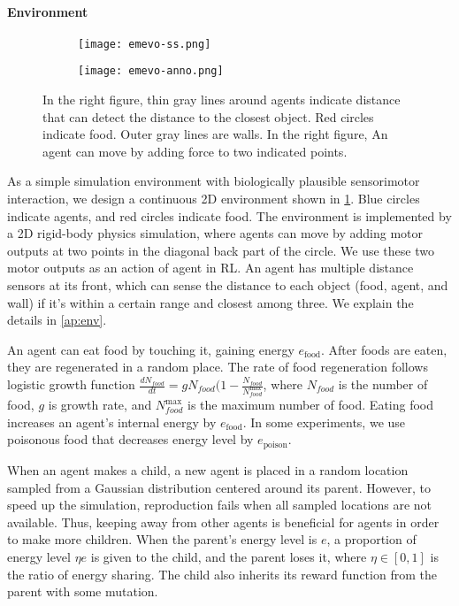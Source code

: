 \paragraph{Environment}

\begin{figure}[t]
  \begin{subfigure}[t]{6cm}
    \centering
    \texttt{[image: emevo-ss.png]}
  \end{subfigure}
  \begin{subfigure}[t]{8cm}
    \centering
    \texttt{[image: emevo-anno.png]}
  \end{subfigure}
  \caption{
    In the right figure, thin gray lines around agents indicate distance that can detect the distance to the closest object. Red circles indicate food. Outer gray lines are walls.
    In the right figure, An agent can move by adding force to two indicated points.
  }\label{figure:env}
\end{figure}

As a simple simulation environment with biologically plausible sensorimotor interaction, we design a continuous 2D environment shown in \cref{figure:env}. Blue circles indicate agents, and red circles indicate food. The environment is implemented by a 2D rigid-body physics simulation, where agents can move by adding motor outputs at two points in the diagonal back part of the circle. We use these two motor outputs as an action of agent in RL. An agent has multiple distance sensors at its front, which can sense the distance to each object (food, agent, and wall) if it's within a certain range and closest among three. We explain the details in \cref{ap:env}.

An agent can eat food by touching it, gaining energy $e_{\mathrm{food}}$. After foods are eaten, they are regenerated in a random place. The rate of food regeneration follows logistic growth function $\frac{dN_{food}}{dt} = g N_{food} (1 - \frac{N_{food}}{N_{food}^{\mathrm{max}}}$, where $N_{food}$ is the number of food, $g$ is growth rate, and $N_{food}^{\mathrm{max}}$ is the maximum number of food. Eating food increases an agent's internal energy by $e_{\mathrm{food}}$. In some experiments, we use poisonous food that decreases energy level by $e_{\mathrm{poison}}$.

When an agent makes a child, a new agent is placed in a random location sampled from a Gaussian distribution centered around its parent. However, to speed up the simulation, reproduction fails when all sampled locations are not available. Thus, keeping away from other agents is beneficial for agents in order to make more children. When the parent's energy level is $e$, a proportion of energy level $\eta e$ is given to the child, and the parent loses it, where $\eta \in [0, 1]$ is the ratio of energy sharing. The child also inherits its reward function from the parent with some mutation.

